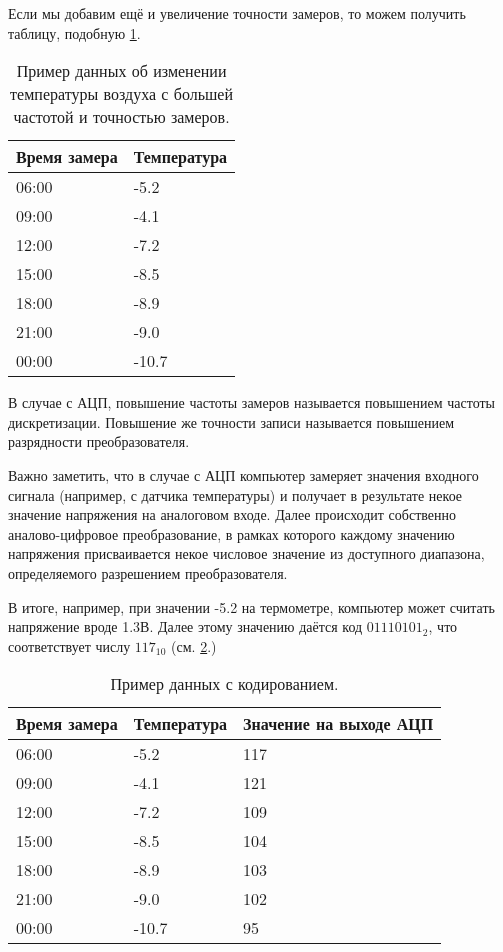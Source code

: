 \documentclass[../sparc.tex]{subfiles}
\begin{document}
Если мы добавим ещё и увеличение точности замеров, то можем получить таблицу,
подобную \ref{table:adc-temperature-data-example-3}.

\begin{table}[h]
  \centering
  \begin{tabular}{p{3cm}|p{4cm}}
    Время замера & Температура \\
    \hline \hline
    06:00 & -5.2 \\
    \hline
    09:00 & -4.1 \\
    \hline
    12:00 & -7.2 \\
    \hline
    15:00 & -8.5 \\
    \hline
    18:00 & -8.9 \\
    \hline
    21:00 & -9.0 \\
    \hline
    00:00 & -10.7 \\
    \hline
  \end{tabular}
  \caption{Пример данных об изменении температуры воздуха с большей частотой
    и точностью замеров.}
  \label{table:adc-temperature-data-example-3}
\end{table}

В случае с АЦП, повышение частоты замеров называется повышением частоты
дискретизации.  Повышение же точности записи называется повышением разрядности
преобразователя.

Важно заметить, что в случае с АЦП компьютер замеряет значения входного сигнала
(например, с датчика температуры) и получает в результате некое значение
напряжения на аналоговом входе.  Далее происходит собственно аналово-цифровое
преобразование, в рамках которого каждому значению напряжения присваивается
некое числовое значение из доступного диапазона, определяемого разрешением
преобразователя.

В итоге, например, при значении -5.2 на термометре, компьютер может считать
напряжение вроде 1.3В.  Далее этому значению даётся код $01110101_2$, что
соответствует числу $117_{10}$ (см. \ref{table:adc-temperature-data-example-4}.)

\begin{table}[h]
  \centering
  \begin{tabular}{p{3cm}|p{4cm}|p{4cm}}
    Время замера & Температура & Значение на выходе АЦП \\
    \hline \hline
    06:00 & -5.2  & 117 \\
    \hline
    09:00 & -4.1  & 121 \\
    \hline
    12:00 & -7.2  & 109 \\
    \hline
    15:00 & -8.5  & 104 \\
    \hline
    18:00 & -8.9  & 103 \\
    \hline
    21:00 & -9.0  & 102 \\
    \hline
    00:00 & -10.7 & 95 \\
    \hline
  \end{tabular}
  \caption{Пример данных с кодированием.}
  \label{table:adc-temperature-data-example-4}
\end{table}
\end{document}
